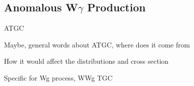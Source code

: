 \subsection{Anomalous W$\gamma$ Production}
ATGC

Maybe, general words about ATGC, where does it come from

How it would affect the distributions and cross section

Specific for Wg process, WWg TGC
